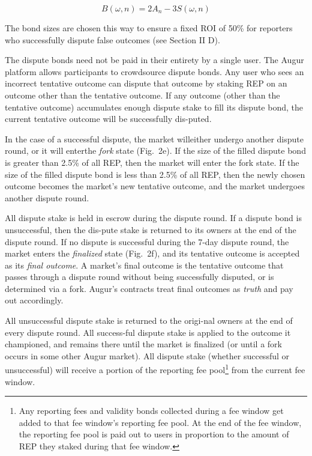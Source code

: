 \documentclass[12pt,floatfix,reprint,nofootinbib,amsmath,amssymb,epsfig,pre,floats,letterpaper,groupedaffiliation]{revtex4-1}
\newcommand{\beq}{\begin{equation}}
\newcommand{\eeq}{\end{equation}}
\theoremstyle{definition}
\theoremstyle{definition}
\begin{document}
\beq
B(\omega, n) = 2A_n - 3S(\omega, n)
\eeq

The bond sizes are chosen this way to ensure a fixed ROI of 50\% for reporters who successfully dispute false outcomes (see Section II D).

The dispute bonds need not be paid in their entirety by a single user. The Augur platform allows participants to crowdsource dispute bonds. Any user who sees an incorrect tentative outcome can dispute that outcome by staking REP on an outcome other than the tentative outcome. If any outcome (other than the tentative outcome) accumulates enough dispute stake to fill its dispute bond, the current tentative outcome will be successfully dis-\linebreak puted.

In the case of a successful dispute, the market will\linebreak either undergo another dispute round, or it will enter\linebreak the \textit{fork} state (Fig.~2e). If the size of the filled dispute bond is greater than 2.5\% of all REP, then the market will enter the fork state. If the size of the filled dispute bond is less than 2.5\% of all REP, then the newly chosen outcome becomes the market's new tentative outcome, and the market undergoes another dispute round.

All dispute stake is held in escrow during the dispute round. If a dispute bond is unsuccessful, then the dis-\linebreak pute stake is returned to its owners at the end of the dispute round. If no dispute is successful during the 7-day dispute round, the market enters the \textit{finalized} state (Fig.~2f), and its tentative outcome is accepted as its \textit{fi\linebreak nal outcome}. A market's final outcome is the tentative outcome that passes through a dispute round without being successfully disputed, or is determined via a fork. Augur's contracts treat final outcomes as \textit{truth} and pay out accordingly.

All unsuccessful dispute stake is returned to the origi-\linebreak nal owners at the end of every dispute round. All success-\linebreak ful dispute stake is applied to the outcome it championed, and remains there until the market is finalized (or until a fork occurs in some other Augur market). All dispute stake (whether successful or unsuccessful) will receive a portion of the reporting fee pool\footnote{Any reporting fees and validity bonds collected during a fee window get added to that fee window's reporting fee pool. At the end of the fee window, the reporting fee pool is paid out to users in proportion to the amount of REP they staked during that fee window.} from the current fee window.
\end{document}
